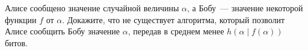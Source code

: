 Алисе сообщено значение случайной величины $\alpha$, а Бобу~--- значение некоторой функции $f$ от
$\alpha$. Докажите, что не существует алгоритма, который позволит Алисе сообщить Бобу значение $\alpha$,
передав в среднем менее $h(\alpha \mid f(\alpha))$ битов.